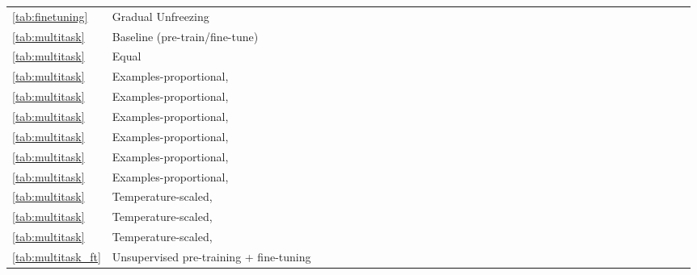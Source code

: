 \documentclass[twoside,11pt]{article}
\newcommand{\bsl}{\makebox[0pt][r]{\raisebox{0.05em}{}}}
\begin{document}
\begin{table}[!ht]
\begin{minipage}{0.85\pdfpagewidth}
\begin{tabular}{llccccccccccccccccccccccccccccccccc}
\ref{tab:finetuning} & Gradual Unfreezing &  &  &  &  &  &  &  &  &  &  &  &  &  &  &  &  &  &  &  &  &  &  &  &  &  &  &  &  &  &  &  &  &  \\
\cmidrule(r){1-2} \cmidrule(lr){3-15} \cmidrule(lr){16-18} \cmidrule(lr){19-20} \cmidrule(lr){21-32} \cmidrule(l){33-35}
\ref{tab:multitask} & \bsl Baseline (pre-train/fine-tune) &  &  &  &  &  &  &  &  &  &  &  &  &  &  &  &  &  &  &  &  &  &  &  &  &  &  &  &  &  &  &  &  &  \\
\ref{tab:multitask} & Equal &  &  &  &  &  &  &  &  &  &  &  &  &  &  &  &  &  &  &  &  &  &  &  &  &  &  &  &  &  &  &  &  &  \\
\ref{tab:multitask} & Examples-proportional,  &  &  &  &  &  &  &  &  &  &  &  &  &  &  &  &  &  &  &  &  &  &  &  &  &  &  &  &  &  &  &  &  &  \\
\ref{tab:multitask} & Examples-proportional,  &  &  &  &  &  &  &  &  &  &  &  &  &  &  &  &  &  &  &  &  &  &  &  &  &  &  &  &  &  &  &  &  &  \\
\ref{tab:multitask} & Examples-proportional,  &  &  &  &  &  &  &  &  &  &  &  &  &  &  &  &  &  &  &  &  &  &  &  &  &  &  &  &  &  &  &  &  &
  \\
\ref{tab:multitask} & Examples-proportional,  &  &  &  &  &  &  &  &  &  &  &  &  &  &  &  &  &  &  &  &  &  &  &  &  &  &  &  &  &  &  &  &  &  \\
\ref{tab:multitask} & Examples-proportional,  &  &  &  &  &  &  &  &  &  &  &  &  &  &  &  &  &  &  &  &  &  &  &  &  &  &  &  &  &  &  &  &  &  \\
\ref{tab:multitask} & Examples-proportional,  &  &  &  &  &  &  &  &  &  &  &  &  &  &  &  &  &  &  &  &  &  &  &  &  &  &  &  &  &  &  &  &  &  \\
\ref{tab:multitask} & Temperature-scaled,  &  &  &  &  &  &  &  &  &  &  &  &  &  &  &  &  &  &  &  &  &  &  &  &  &  &  &  &  &  &  &  &  &  \\
\ref{tab:multitask} & Temperature-scaled,  &  &  &  &  &  &  &  &  &  &  &  &  &  &  &  &  &  &  &  &  &  &  &  &  &  &  &  &  &  &  &  &  &  \\
\ref{tab:multitask} & Temperature-scaled,  &  &  &  &  &  &  &  &  &  &  &  &  &  &  &  &  &  &  &  &  &  &  &  &  &  &  &  &  &  &  &  &  &  \\
\cmidrule(r){1-2} \cmidrule(lr){3-15} \cmidrule(lr){16-18} \cmidrule(lr){19-20} \cmidrule(lr){21-32} \cmidrule(l){33-35}
\ref{tab:multitask_ft} & \bsl Unsupervised pre-training + fine-tuning &  &  &  &  &  &  &  &  &  &  &  &  &  &  &  &  &  &  &  &  &  &  &  &  &  &  &  &  &  &  &  &  &  \\

\end{tabular}
\end{minipage}
\end{table}
\end{document}

